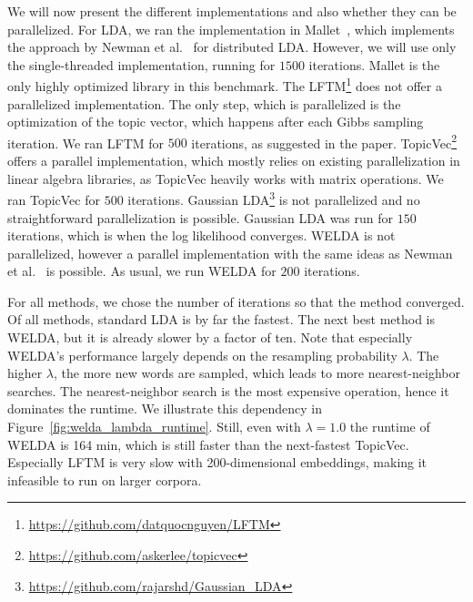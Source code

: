 \documentclass[
        a4paper,
        titlepage,
        twoside,
        parskip,
        numbers=noenddot
        ]{scrbook}
\theoremstyle{break}
\begin{document}
We will now present the different implementations and also whether they can be parallelized.
For LDA, we ran the implementation in Mallet~\cite{McCallum2002}, which implements the approach by Newman et al.~\cite{Newman2009} for distributed LDA.
However, we will use only the single-threaded implementation, running for $1500$ iterations.
Mallet is the only highly optimized library in this benchmark.
The LFTM\footnote{\url{https://github.com/datquocnguyen/LFTM}} does not offer a parallelized implementation.
The only step, which is parallelized is the optimization of the topic vector, which happens after each Gibbs sampling iteration.
We ran LFTM for $500$ iterations, as suggested in the paper.
TopicVec\footnote{\url{https://github.com/askerlee/topicvec}} offers a parallel implementation, which mostly relies on existing parallelization in linear algebra libraries, as TopicVec heavily works with matrix operations.
We ran TopicVec for $500$ iterations.
Gaussian LDA\footnote{\url{https://github.com/rajarshd/Gaussian_LDA}} is not parallelized and no straightforward parallelization is possible.
Gaussian LDA was run for $150$ iterations,  which is when the log likelihood converges.
WELDA is not parallelized, however a parallel implementation with the same ideas as Newman et al.~\cite{Newman2009} is possible.
As usual, we run WELDA for $200$ iterations.

For all methods, we chose the number of iterations so that the method converged.
Of all methods, standard LDA is by far the fastest.
The next best method is WELDA, but it is already slower by a factor of ten.
Note that especially WELDA's performance largely depends on the resampling probability $\lambda$.
The higher $\lambda$, the more new words are sampled, which leads to more nearest-neighbor searches.
The nearest-neighbor search is the most expensive operation, hence it dominates the runtime.
We illustrate this dependency in Figure~\ref{fig:welda_lambda_runtime}.
Still, even with $\lambda = 1.0$ the runtime of WELDA is 164 min, which is still faster than the next-fastest TopicVec.
Especially LFTM is very slow with 200-dimensional embeddings, making it infeasible to run on larger corpora.
\end{document}
